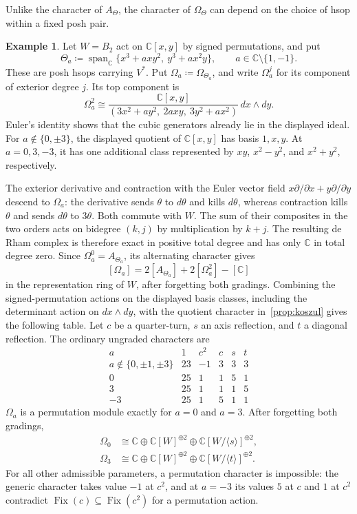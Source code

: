 \documentclass[11pt]{amsart}
\newcommand{\defeq}{\coloneqq}
\theoremstyle{definition}
\newtheorem{example}[theorem]{Example}
\newcommand{\C}{\mathbb C}\newcommand{\Q}{\mathbb Q}
\DeclareMathOperator{\Fix}{Fix}
\begin{document}
Unlike the character of $A_\Theta$, the character of $\Omega_\Theta$
can depend on the choice of hsop within a fixed posh pair.

\begin{example}\label{ex:b2-differential-parking}
Let $W=B_2$ act on $\C[x,y]$ by signed permutations, and put
\[
 \Theta_a\defeq\operatorname{span}_{\C}
 \{x^3+axy^2,\ y^3+ax^2y\},
 \qquad a\in\C\setminus\{1,-1\}.
\]
These are posh hsops carrying $V^*$. Put $\Omega_a\defeq\Omega_{\Theta_a}$,
and write $\Omega_a^j$ for its component of exterior degree $j$.
Its top component is
\[
 \Omega_a^2\cong
 \frac{\C[x,y]}{(3x^2+ay^2,\ 2axy,\ 3y^2+ax^2)}\,dx\wedge dy.
\]
Euler's identity shows that the cubic generators already lie in the
displayed ideal. For $a\notin\{0,\pm3\}$, the displayed quotient of $\C[x,y]$ has basis
$1,x,y$. At $a=0,3,-3$, it has one additional class represented by
$xy$, $x^2-y^2$, and $x^2+y^2$, respectively.

The exterior derivative and contraction with the Euler vector field
$x\partial/\partial x+y\partial/\partial y$ descend to $\Omega_a$:
the derivative sends $\theta$ to $d\theta$ and kills $d\theta$,
whereas contraction kills $\theta$ and sends $d\theta$ to $3\theta$.
Both commute with $W$. The sum of their composites in the two orders
acts on bidegree $(k,j)$ by multiplication by $k+j$. The resulting
de Rham complex is therefore
exact in positive total degree and has only $\C$ in total degree zero.
Since $\Omega_a^0=A_{\Theta_a}$, its alternating character gives
\[
 [\Omega_a]=2[A_{\Theta_a}]+2[\Omega_a^2]-[\C]
\]
in the representation ring of $W$, after forgetting both gradings.
Combining the signed-permutation actions on the displayed basis
classes, including the determinant action on $dx\wedge dy$, with
the quotient character in~\cref{prop:koszul} gives the following table.
Let $c$ be a quarter-turn, $s$ an axis reflection, and $t$ a diagonal
reflection. The ordinary ungraded characters are
\[
 \begin{array}{c|rrrrr}
 a & 1 & c^2 & c & s & t\\\hline
 a\notin\{0,\pm1,\pm3\} & 23 & -1 & 3 & 3 & 3\\
 0 & 25 & 1 & 1 & 5 & 1\\
 3 & 25 & 1 & 1 & 1 & 5\\
 -3 & 25 & 1 & 5 & 1 & 1
 \end{array}
\]
$\Omega_a$ is a permutation module exactly for $a=0$ and $a=3$.  After forgetting both gradings,
\[
 \begin{aligned}
 \Omega_0&\cong\C\oplus\C[W]^{\oplus2}
       \oplus\C[W/\langle s\rangle]^{\oplus2},\\
 \Omega_3&\cong\C\oplus\C[W]^{\oplus2}
       \oplus\C[W/\langle t\rangle]^{\oplus2}.
 \end{aligned}
\]
For all other admissible parameters, a permutation character is
impossible: the generic character takes value $-1$ at $c^2$, and
at $a=-3$ its values $5$ at $c$ and $1$ at $c^2$ contradict
$\Fix(c)\subseteq\Fix(c^2)$ for a permutation action.
\end{example}
\end{document}
